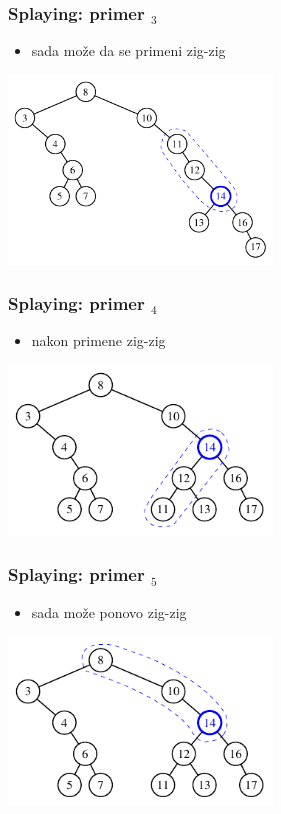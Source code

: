 \documentclass[compress]{beamer}
\begin{document}
\begin{frame}[fragile]
  \frametitle{Splaying: primer $_3$}
  \begin{itemize}
    \item sada može da se primeni zig-zig
  \end{itemize}
  \begin{center}
    \includegraphics[width=7cm]{asp-11-pic23.pdf}
  \end{center}
\end{frame}

\begin{frame}[fragile]
  \frametitle{Splaying: primer $_4$}
  \begin{itemize}
    \item nakon primene zig-zig
  \end{itemize}
  \begin{center}
    \includegraphics[width=7cm]{asp-11-pic24.pdf}
  \end{center}
\end{frame}

\begin{frame}[fragile]
  \frametitle{Splaying: primer $_5$}
  \begin{itemize}
    \item sada može ponovo zig-zig
  \end{itemize}
  \begin{center}
    \includegraphics[width=7cm]{asp-11-pic25.pdf}
  \end{center}
\end{frame}
\end{document}
